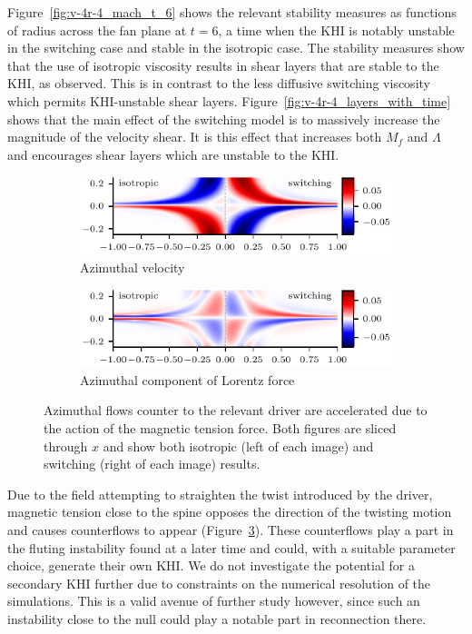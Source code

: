 Figure~\ref{fig:v-4r-4_mach_t_6} shows the relevant stability measures as functions of radius across the fan plane at $t=6$, a time when the KHI is notably unstable in the switching case and stable in the isotropic case. The stability measures show that the use of isotropic viscosity results in shear layers that are stable to the KHI, as observed. This is in contrast to the less diffusive switching viscosity which permits KHI-unstable shear layers. Figure~\ref{fig:v-4r-4_layers_with_time} shows that the main effect of the switching model is to massively increase the magnitude of the velocity shear. It is this effect that increases both $M_f$ and $\Lambda$ and encourages shear layers which are unstable to the KHI.

\begin{figure}[t]
  \centering
    \begin{subfigure}{0.49\textwidth}
      \includegraphics[width=\linewidth]{v-4r-4_counterflows_t_3}
      \caption{Azimuthal velocity}
      \label{fig:v-4r-4_counterflows_t_3}
    \end{subfigure}
    \hfill
    \begin{subfigure}{0.49\textwidth}
      \includegraphics[width=\linewidth]{v-4r-4_lorentz_counterflows_t_3}
      \caption{Azimuthal component of Lorentz force}
      \label{fig:v-4r-4_lorentz_counterflows_t_3}
    \end{subfigure}
\caption{Azimuthal flows counter to the relevant driver are accelerated due to the action of the magnetic tension force. Both figures are sliced through $x$ and show both isotropic (left of each image) and switching (right of each image) results.}
\label{fig:counterflows}%
\end{figure}

Due to the field attempting to straighten the twist introduced by the driver, magnetic tension close to the spine opposes the direction of the twisting motion and causes counterflows to appear (Figure~\ref{fig:counterflows}). These counterflows play a part in the fluting instability found at a later time and could, with a suitable parameter choice, generate their own KHI. We do not investigate the potential for a secondary KHI further due to constraints on the numerical resolution of the simulations. This is a valid avenue of further study however, since such an instability close to the null could play a notable part in reconnection there.

